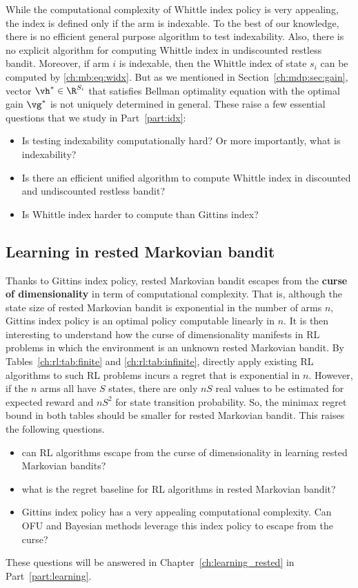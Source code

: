 While the computational complexity of Whittle index policy is very appealing, the index is defined only if the arm is indexable.
To the best of our knowledge, there is no efficient general purpose algorithm to test indexability.
Also, there is no explicit algorithm for computing Whittle index in undiscounted restless bandit.
Moreover, if arm $i$ is indexable, then the Whittle index of state $s_i$ can be computed by \eqref{ch:mb:eq:widx}. %
But as we mentioned in Section~\ref{ch:mdp:sec:gain}, vector $\vh^*\in\R^{S_i}$ that satisfies Bellman optimality equation with the optimal gain $\vg^*$ is not uniquely determined in general.
These raise a few essential questions that we study in Part~\ref{part:idx}:
\begin{itemize}
    \item Is testing indexability computationally hard? Or more importantly, what is indexability?
    \item Is there an efficient unified algorithm to compute Whittle index in discounted and undiscounted restless bandit?
    \item Is Whittle index harder to compute than Gittins index?
\end{itemize}


\subsection{Learning in rested Markovian bandit}

Thanks to Gittins index policy, rested Markovian bandit escapes from the \textbf{curse of dimensionality} in term of computational complexity.
That is, although the state size of rested Markovian bandit is exponential in the number of arms $n$, Gittins index policy is an optimal policy computable linearly in $n$.
It is then interesting to understand how the curse of dimensionality manifests in RL problems in which the environment is an unknown rested Markovian bandit.
By Tables~\ref{ch:rl:tab:finite} and \ref{ch:rl:tab:infinite}, directly apply existing RL algorithms to such RL problems incurs a regret that is exponential in $n$.
However, if the $n$ arms all have $S$ states, there are only $nS$ real values to be estimated for expected reward and $nS^2$ for state transition probability.
So, the minimax regret bound in both tables should be smaller for rested Markovian bandit.
This raises the following questions.
\begin{itemize}
    \item can RL algorithms escape from the curse of dimensionality in learning rested Markovian bandits?
    \item what is the regret baseline for RL algorithms in rested Markovian bandit?
    \item Gittins index policy has a very appealing computational complexity. Can OFU and Bayesian methods leverage this index policy to escape from the curse?
\end{itemize}
These questions will be answered in Chapter~\ref{ch:learning_rested} in Part~\ref{part:learning}.

